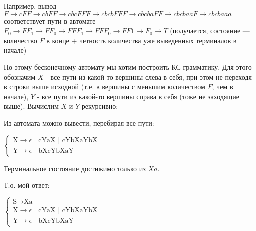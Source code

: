 \documentclass[12pt,a4paper]{scrartcl}
\begin{document}
\begin{description}
	Например, вывод $F \rightarrow cFF \rightarrow cbFF \rightarrow cbcFFF \rightarrow cbcbFFF \rightarrow cbcbaFF \rightarrow cbcbaaF \rightarrow cbcbaaa$ соответствует пути в автомате $F_0 \rightarrow FF_1 \rightarrow FF_0 \rightarrow FFF_1 \rightarrow FFF_0 \rightarrow FF1 \rightarrow F_0 \rightarrow T$ (получается, состояние --- количество $F$ в конце + четность количества уже выведенных терминалов в начале)
	
	По этому бесконечному автомату мы хотим построить КС грамматику. Для этого обозначим $X$ - все пути из какой-то вершины слева в себя, при этом не переходя в строки выше исходной (т.е. в вершины с меньшим количеством $F$, чем в начале), $Y$ - все пути из какой-то вершины справа в себя (тоже не заходящие выше). Вычислим $X$ и $Y$ рекурсивно:
	
	Из автомата можно вывести, перебирая все пути:
	
	$\begin{cases}
	\text{X} \rightarrow \epsilon \text{ | cYaX | cYbXaYbX}\\
	\text{Y} \rightarrow \epsilon \text{ | bXcYbXaY}
	\end{cases}$
	
	Терминальное состояние достижимо только из $Xa$.
	
	Т.о. мой ответ:
	
	$\begin{cases}
	\text{S} \rightarrow \text{Xa}\\
	\text{X} \rightarrow \epsilon \text{ | cYaX | cYbXaYbX}\\
	\text{Y} \rightarrow \epsilon \text{ | bXcYbXaY}
	\end{cases}$
	
	
	
\end{description}
\end{document}

